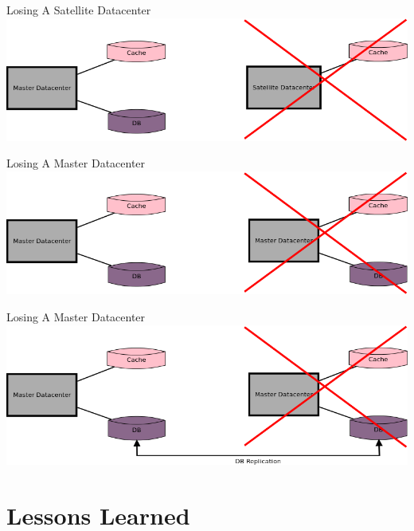 \documentclass[aspectratio=169]{beamer}
\begin{document}
\begin{frame}{Losing A Satellite Datacenter}
    \includegraphics[width=\textwidth]{images/lostsatellitedc.png}
\end{frame}

\begin{frame}{Losing A Master Datacenter}
    \includegraphics[width=\textwidth]{images/lostmasterdc.png}
\end{frame}

\begin{frame}{Losing A Master Datacenter}
    \includegraphics[width=\textwidth]{images/lostmasterdchope.png}
\end{frame}

\section{Lessons Learned}
\end{document}
